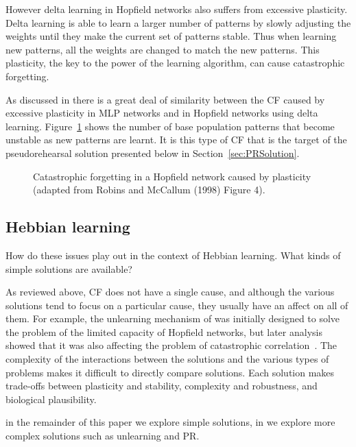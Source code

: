 However delta learning in Hopfield networks also suffers from excessive plasticity.  Delta learning is able to learn a larger number of patterns by slowly adjusting the weights until they make the current set of patterns stable.  Thus when learning new patterns, all the weights are changed to match the new patterns.  This plasticity, the key to the power of the learning algorithm, can cause catastrophic forgetting.
 
As discussed in \citet{Robins1998} there is a great deal of similarity between the CF caused by excessive plasticity in MLP networks and in Hopfield networks using delta learning. Figure~\ref{fig:HOP-CP} shows the number of base population patterns that become unstable as new patterns are learnt.  It is this type of CF that is the target of the pseudorehearsal solution presented below in Section~\ref{sec:PRSolution}.

\begin{figure}[tbp]
\small
\center
	\caption{Catastrophic forgetting in a Hopfield network caused by plasticity (adapted from Robins and McCallum (1998) Figure 4).}
	\label{fig:HOP-CP}
\end{figure}

\subsection{Hebbian learning}  %
\label{sec:hebbianSolutions}

How do these issues play out in the context of Hebbian learning.  What kinds of simple solutions are available? 

As reviewed above, CF does not have a single cause, and although the various solutions tend to focus on a particular cause, they usually have an affect on all of them.  For example, the unlearning mechanism of  was initially designed to solve the problem of the limited capacity of Hopfield networks, but later analysis showed that it was also affecting the problem of catastrophic correlation~\citep{Christos1996}.  The complexity of the interactions between the solutions and the various types of problems makes it difficult to directly compare solutions.  Each solution makes trade-offs between plasticity and stability, complexity and robustness, and biological plausibility.  

in the remainder of this paper we explore simple solutions, in \cite{McCallum201b} we explore more complex solutions such as unlearning and PR. 

